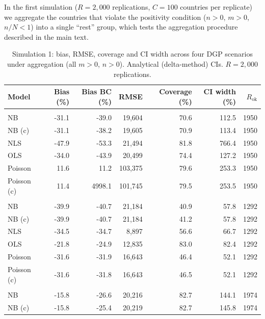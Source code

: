 In the first simulation ($R = 2{,}000$ replications, $C = 100$ countries
per replicate) we aggregate the countries that violate the positivity
condition ($n > 0$, $m > 0$, $n/N < 1$) into a single ``rest'' group,
which tests the aggregation procedure described in the main text.


\begin{table}[ht!]
\caption{\label{tbl-sim1}Simulation 1: bias, RMSE, coverage and CI width across four DGP scenarios under aggregation (all $m>0$, $n>0$). Analytical (delta-method) CIs. $R = 2{,}000$ replications.} 
\fontsize{8.0pt}{9.0pt}\selectfont
\begin{tabular*}{\linewidth}{@{\extracolsep{\fill}}lrrrrrr}
\toprule
Model & Bias (\%) & Bias BC (\%) & RMSE & Coverage (\%) & CI width (\%) & $R_{\text{ok}}$ \\ 
\midrule\addlinespace[2.5pt]
\multicolumn{7}{l}{NB($n$)-NB($m$)} \\[2.5pt] 
\midrule\addlinespace[2.5pt]
NB & -31.1 & -39.0 & 19,604 & 70.6 & 112.5 & 1950 \\ 
NB (c) & -31.1 & -38.2 & 19,605 & 70.9 & 113.4 & 1950 \\ 
NLS & -47.9 & -53.3 & 21,494 & 81.8 & 766.4 & 1950 \\ 
OLS & -34.0 & -43.9 & 20,499 & 74.4 & 127.2 & 1950 \\ 
Poisson & 11.6 & 11.2 & 103,375 & 79.6 & 253.3 & 1950 \\ 
Poisson (c) & 11.4 & 4998.1 & 101,745 & 79.5 & 253.5 & 1950 \\ 
\midrule\addlinespace[2.5pt]
\multicolumn{7}{l}{NB($n$)-Po($m$)} \\[2.5pt] 
\midrule\addlinespace[2.5pt]
NB & -39.9 & -40.7 & 21,184 & 40.9 & 57.8 & 1292 \\ 
NB (c) & -39.9 & -40.7 & 21,184 & 41.2 & 57.8 & 1292 \\ 
NLS & -34.5 & -34.7 & 8,897 & 56.6 & 66.7 & 1292 \\ 
OLS & -21.8 & -24.9 & 12,835 & 83.0 & 82.4 & 1292 \\ 
Poisson & -31.6 & -31.9 & 16,643 & 46.4 & 52.1 & 1292 \\ 
Poisson (c) & -31.6 & -31.8 & 16,643 & 46.5 & 52.1 & 1292 \\ 
\midrule\addlinespace[2.5pt]
\multicolumn{7}{l}{Po($n$)-NB($m$)} \\[2.5pt] 
\midrule\addlinespace[2.5pt]
NB & -15.8 & -26.6 & 20,216 & 82.7 & 144.1 & 1974 \\ 
NB (c) & -15.8 & -25.4 & 20,219 & 82.7 & 145.8 & 1974 \\ 

\end{tabular*}
\end{table}
